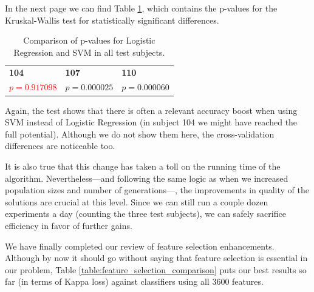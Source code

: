     In the next page we can find Table \ref{table:models_kruskal}, which contains the p-values for the Kruskal-Wallis test for statistically significant differences.

\newpage

     \begin{table}[h]

        \centering
        \setlength\arrayrulewidth{0.8pt}

        \begin{tabular}{| >{\centering\arraybackslash}m{0.9in} |  >{\centering\arraybackslash}m{0.9in} | >{\centering\arraybackslash}m{0.9in} |}

        	\hline
        	\rowcolor{RoyalBlue}
        	\multicolumn{3}{| >{\centering\arraybackslash}m{3.054in} |}{\textbf{Logistic Regression against SVM}} \\
            \hline
            \rowcolor{RoyalBlue}
            \textbf{104} & \textbf{107} & \textbf{110} \\
            \hline
            \textcolor{red}{$p = 0.917098$} & $p = 0.000025$ & $p = 0.000060$ \\
            \hline

        \end{tabular}

        \caption{Comparison of p-values for Logistic Regression and SVM in all test subjects.}\label{table:models_kruskal}

    \end{table}

    Again, the test shows that there is often a relevant accuracy boost when using \acs{SVM} instead of Logistic Regression (in subject 104 we might have reached the full potential). Although we do not show them here, the cross-validation differences are noticeable too.

    It is also true that this change has taken a toll on the running time of the algorithm. Nevertheless---and following the same logic as when we increased population sizes and number of generations---, the improvements in quality of the solutions are crucial at this level. Since we can still run a couple dozen experiments a day (counting the three test subjects), we can safely sacrifice efficiency in favor of further gains.

	We have finally completed our review of feature selection enhancements. Although by now it should go without saying that feature selection is essential in our problem, Table \ref{table:feature_selection_comparison} puts our best results so far (in terms of Kappa loss) against classifiers using all 3600 features.

